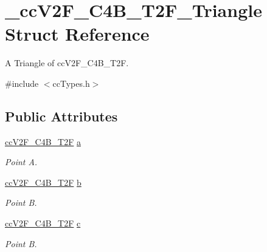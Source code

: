 \hypertarget{struct__cc_v2_f___c4_b___t2_f___triangle}{\section{\-\_\-cc\-V2\-F\-\_\-\-C4\-B\-\_\-\-T2\-F\-\_\-\-Triangle Struct Reference}
\label{struct__cc_v2_f___c4_b___t2_f___triangle}
}


A Triangle of cc\-V2\-F\-\_\-\-C4\-B\-\_\-\-T2\-F.  




{\ttfamily \#include $<$cc\-Types.\-h$>$}

\subsection*{Public Attributes}
\begin{DoxyCompactItemize}
\item 
\hypertarget{struct__cc_v2_f___c4_b___t2_f___triangle_ae21fb121a966562d1282abde81ed84ba}{\hyperlink{cc_types_8h_aa3f3456208d3090768d2c9bff64412ac}{cc\-V2\-F\-\_\-\-C4\-B\-\_\-\-T2\-F} \hyperlink{struct__cc_v2_f___c4_b___t2_f___triangle_ae21fb121a966562d1282abde81ed84ba}{a}}\label{struct__cc_v2_f___c4_b___t2_f___triangle_ae21fb121a966562d1282abde81ed84ba}

\begin{DoxyCompactList}\small\item\em Point A. \end{DoxyCompactList}\item 
\hypertarget{struct__cc_v2_f___c4_b___t2_f___triangle_a8fef6af8e34aa35c8def8c91e0c997c1}{\hyperlink{cc_types_8h_aa3f3456208d3090768d2c9bff64412ac}{cc\-V2\-F\-\_\-\-C4\-B\-\_\-\-T2\-F} \hyperlink{struct__cc_v2_f___c4_b___t2_f___triangle_a8fef6af8e34aa35c8def8c91e0c997c1}{b}}\label{struct__cc_v2_f___c4_b___t2_f___triangle_a8fef6af8e34aa35c8def8c91e0c997c1}

\begin{DoxyCompactList}\small\item\em Point B. \end{DoxyCompactList}\item 
\hypertarget{struct__cc_v2_f___c4_b___t2_f___triangle_a1424a4171d11a670fe764ce4522d34f3}{\hyperlink{cc_types_8h_aa3f3456208d3090768d2c9bff64412ac}{cc\-V2\-F\-\_\-\-C4\-B\-\_\-\-T2\-F} \hyperlink{struct__cc_v2_f___c4_b___t2_f___triangle_a1424a4171d11a670fe764ce4522d34f3}{c}}\label{struct__cc_v2_f___c4_b___t2_f___triangle_a1424a4171d11a670fe764ce4522d34f3}

\begin{DoxyCompactList}\small\item\em Point B. \end{DoxyCompactList}\end{DoxyCompactItemize}



